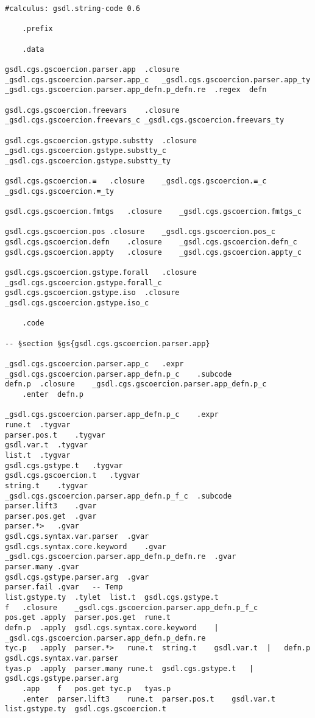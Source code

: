 \documentclass{report}
\begin{document}
\begin{verbatim}
#calculus: gsdl.string-code 0.6

	.prefix

	.data

gsdl.cgs.gscoercion.parser.app	.closure	_gsdl.cgs.gscoercion.parser.app_c	_gsdl.cgs.gscoercion.parser.app_ty
_gsdl.cgs.gscoercion.parser.app_defn.p_defn.re	.regex	defn

gsdl.cgs.gscoercion.freevars	.closure	_gsdl.cgs.gscoercion.freevars_c	_gsdl.cgs.gscoercion.freevars_ty

gsdl.cgs.gscoercion.gstype.substty	.closure	_gsdl.cgs.gscoercion.gstype.substty_c	_gsdl.cgs.gscoercion.gstype.substty_ty

gsdl.cgs.gscoercion.≡	.closure	_gsdl.cgs.gscoercion.≡_c	_gsdl.cgs.gscoercion.≡_ty

gsdl.cgs.gscoercion.fmtgs	.closure	_gsdl.cgs.gscoercion.fmtgs_c

gsdl.cgs.gscoercion.pos	.closure	_gsdl.cgs.gscoercion.pos_c
gsdl.cgs.gscoercion.defn	.closure	_gsdl.cgs.gscoercion.defn_c
gsdl.cgs.gscoercion.appty	.closure	_gsdl.cgs.gscoercion.appty_c

gsdl.cgs.gscoercion.gstype.forall	.closure	_gsdl.cgs.gscoercion.gstype.forall_c
gsdl.cgs.gscoercion.gstype.iso	.closure	_gsdl.cgs.gscoercion.gstype.iso_c

	.code

-- §section §gs{gsdl.cgs.gscoercion.parser.app}

_gsdl.cgs.gscoercion.parser.app_c	.expr
_gsdl.cgs.gscoercion.parser.app_defn.p_c	.subcode
defn.p	.closure	_gsdl.cgs.gscoercion.parser.app_defn.p_c
	.enter	defn.p

_gsdl.cgs.gscoercion.parser.app_defn.p_c	.expr
rune.t	.tygvar
parser.pos.t	.tygvar
gsdl.var.t	.tygvar
list.t	.tygvar
gsdl.cgs.gstype.t	.tygvar
gsdl.cgs.gscoercion.t	.tygvar
string.t	.tygvar
_gsdl.cgs.gscoercion.parser.app_defn.p_f_c	.subcode
parser.lift3	.gvar
parser.pos.get	.gvar
parser.*>	.gvar
gsdl.cgs.syntax.var.parser	.gvar
gsdl.cgs.syntax.core.keyword	.gvar
_gsdl.cgs.gscoercion.parser.app_defn.p_defn.re	.gvar
parser.many	.gvar
gsdl.cgs.gstype.parser.arg	.gvar
parser.fail	.gvar	-- Temp
list.gstype.ty	.tylet	list.t	gsdl.cgs.gstype.t
f	.closure	_gsdl.cgs.gscoercion.parser.app_defn.p_f_c
pos.get	.apply	parser.pos.get	rune.t
defn.p	.apply	gsdl.cgs.syntax.core.keyword	|	_gsdl.cgs.gscoercion.parser.app_defn.p_defn.re
tyc.p	.apply	parser.*>	rune.t	string.t	gsdl.var.t	|	defn.p	gsdl.cgs.syntax.var.parser
tyas.p	.apply	parser.many	rune.t	gsdl.cgs.gstype.t	|	gsdl.cgs.gstype.parser.arg
	.app	f	pos.get	tyc.p	tyas.p
	.enter	parser.lift3	rune.t	parser.pos.t	gsdl.var.t	list.gstype.ty	gsdl.cgs.gscoercion.t


\end{verbatim}
\end{document}
